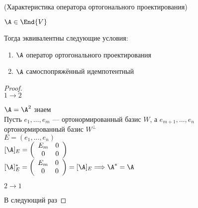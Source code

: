 \begin{theorem}(Характеристика оператора ортогонального проектирования)

    $\A \in \End{V}$

    Тогда эквивалентны следующие условия:
    \begin{enumerate}
        \item $\A$ оператор ортогонального проектирования
        \item $\A$ самоспопряжённый идемпотентный
    \end{enumerate}

    \begin{proof}
    $ $ \\
    $ 1 \to 2 $

    $ \A = \A^2 $ знаем \\
    Пусть $e_1, \dots, e_m$ --- ортонормированный базис $W$, а $e_{m + 1}, \dots, e_n$ ортонормированный базис $W^{\perp}$ \\
    $E = (e_1, \dots, e_n)$ \\
    $[\A]_E = \left(\begin{array}{cc}
    E_m & 0 \\ 
    0 & 0
    \end{array}\right)$ \\
    $[\A]^*_E = \left(\begin{array}{cc}
    E_m & 0 \\ 
    0 & 0
    \end{array}\right) = [\A]_E \Longrightarrow \A^* = \A$

    $2 \to 1$

    В следующий раз
    \end{proof}
\end{theorem}
